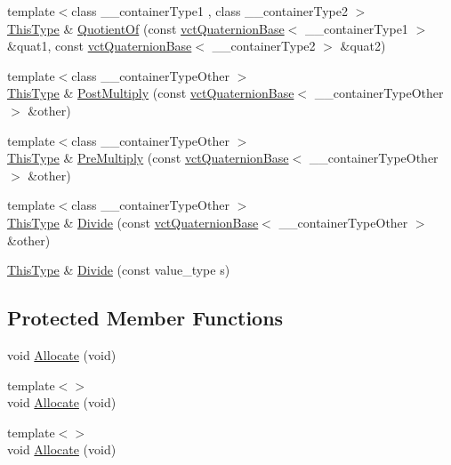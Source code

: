 \begin{DoxyCompactItemize}
\item 
{\footnotesize template$<$class \+\_\+\+\_\+container\+Type1 , class \+\_\+\+\_\+container\+Type2 $>$ }\\\hyperlink{classvct_quaternion_base_af28efdc38acf89acb7a67afada11408c}{This\+Type} \& \hyperlink{classvct_quaternion_base_a85152e0fee1a3184cbfb7e8d1afaa959}{Quotient\+Of} (const \hyperlink{classvct_quaternion_base}{vct\+Quaternion\+Base}$<$ \+\_\+\+\_\+container\+Type1 $>$ \&quat1, const \hyperlink{classvct_quaternion_base}{vct\+Quaternion\+Base}$<$ \+\_\+\+\_\+container\+Type2 $>$ \&quat2)
\item 
{\footnotesize template$<$class \+\_\+\+\_\+container\+Type\+Other $>$ }\\\hyperlink{classvct_quaternion_base_af28efdc38acf89acb7a67afada11408c}{This\+Type} \& \hyperlink{classvct_quaternion_base_abc69080b11a4e42fd7f6d018a18103cb}{Post\+Multiply} (const \hyperlink{classvct_quaternion_base}{vct\+Quaternion\+Base}$<$ \+\_\+\+\_\+container\+Type\+Other $>$ \&other)
\item 
{\footnotesize template$<$class \+\_\+\+\_\+container\+Type\+Other $>$ }\\\hyperlink{classvct_quaternion_base_af28efdc38acf89acb7a67afada11408c}{This\+Type} \& \hyperlink{classvct_quaternion_base_ab9b8449e0e07924a726e9cadf79bef70}{Pre\+Multiply} (const \hyperlink{classvct_quaternion_base}{vct\+Quaternion\+Base}$<$ \+\_\+\+\_\+container\+Type\+Other $>$ \&other)
\item 
{\footnotesize template$<$class \+\_\+\+\_\+container\+Type\+Other $>$ }\\\hyperlink{classvct_quaternion_base_af28efdc38acf89acb7a67afada11408c}{This\+Type} \& \hyperlink{classvct_quaternion_base_ab3979bd4ea84a91954df45c38cab1a59}{Divide} (const \hyperlink{classvct_quaternion_base}{vct\+Quaternion\+Base}$<$ \+\_\+\+\_\+container\+Type\+Other $>$ \&other)
\item 
\hyperlink{classvct_quaternion_base_af28efdc38acf89acb7a67afada11408c}{This\+Type} \& \hyperlink{classvct_quaternion_base_ade85802b9a8af92f33c757a8f42ddc11}{Divide} (const value\+\_\+type s)
\end{DoxyCompactItemize}
\subsection*{Protected Member Functions}
\begin{DoxyCompactItemize}
\item 
void \hyperlink{classvct_quaternion_base_a47d79dd8cd6d9f4b0b017ab131aa04d7}{Allocate} (void)
\item 
{\footnotesize template$<$$>$ }\\void \hyperlink{classvct_quaternion_base_ac25cdbaa9860eda94adebf81cc6953db}{Allocate} (void)
\item 
{\footnotesize template$<$$>$ }\\void \hyperlink{classvct_quaternion_base_a14aff972881623f33d31bf8c7b20462b}{Allocate} (void)
\end{DoxyCompactItemize}


